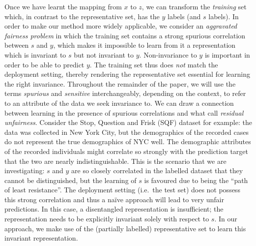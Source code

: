 Once we have learnt the mapping from $x$ to $z$, we can transform the \emph{training} set
which, in contrast to the representative set, has the $y$ labels (and $s$ labels). 
%
In order to make our method more widely applicable, we consider an \emph{aggravated fairness
problem}
in which the training set contains a strong spurious correlation between $s$ and $y$, which makes
it impossible to learn from it a representation which is invariant to $s$ but not invariant to $y$.
Non-invariance to $y$ is important in order to be able to predict $y$. 
%
The training set thus does \emph{not} match the deployment setting, thereby rendering the
representative set essential for learning the right invariance.
Throughout the remainder of the paper, we will use the terms \emph{spurious} and \emph{sensitive}
interchangeably, depending on the context, to refer to an attribute of the data we seek invariance
to.
We can draw a connection between learning in the presence of spurious correlations and what
\citet{kallus2018residual} call \emph{residual unfairness}. 
%
Consider the Stop, Question and Frisk (SQF) dataset for example: the data was collected in New York
City, but the demographics of the recorded cases do not represent the true demographics of NYC
well. 
%
The demographic attributes of the recorded individuals might correlate so strongly with the
prediction target that the two are nearly indistinguishable. 
%
This is the scenario that we are investigating: $s$ and $y$ are so closely correlated in the
labelled dataset that they cannot be distinguished, but the learning of
$s$ is favoured due to being the ``path of least resistance''. 
%
The deployment setting (i.e.\ the test set) does not possess this strong correlation and thus a
na\"ive approach will lead to very unfair predictions. 
%
In this case, a disentangled representation is insufficient; the representation needs to be
explicitly invariant solely with respect to $s$. 
%
In our approach, we make use of the (partially labelled) representative set to learn this invariant
representation.

